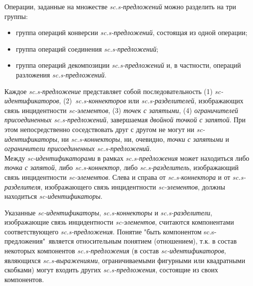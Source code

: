 Операции, заданные на множестве \textit{sc.s-предложений} можно разделить на три группы:
\begin{itemize}
	\item группа операций конверсии \textit{sc.s-предложений}, состоящая из одной операции;
	\item группа операций соединения \textit{sc.s-предложений};
	\item группа операций декомпозиции \textit{sc.s-предложений} и, в частности, операций разложения \textit{sc.s-предложений}.
\end{itemize}

\begin{SCn}
\end{SCn}

Каждое \textit{sc.s-предложение} представляет собой последовательность (1) \textit{sc-идентификаторов}, \mbox{(2) \textit{sc.s-коннекторов}} или \textit{sc.s-разделителей}, изображающих связь инцидентности \textit{sc-элементов}, (3) \textit{точек с запятыми}, (4) \textit{ограничителей присоединенных sc.s-предложений}, завершаемая \textit{двойной точкой с запятой}. При этом непосредственно соседствовать друг с другом не могут ни \textit{\mbox{sc-идентификаторы}}, ни \textit{\mbox{sc.s-коннекторы}}, ни, очевидно, \textit{точки с запятыми} и \textit{ограничители присоединенных sc.s-предложений}.\\
Между \textit{sc-идентификаторами} в рамках \textit{sc.s-предложения} может находиться либо \textit{точка с запятой}, либо \textit{sc.s-коннектор}, либо \textit{sc.s-разделитель}, изображающий связь инцидентности \textit{sc-элементов}. Слева и справа от \textit{sc.s-коннектора} и от \textit{sc.s-разделителя}, изображающего связь инцидентности \textit{sc-элементов}, должны находиться \textit{sc-идентификаторы}.

Указанные \textit{sc-идентификаторы}, \textit{sc.s-коннекторы} и \textit{sc.s-разделители}, изображающие связь инцидентности \textit{sc-элементов}, считаются компонентами соответствующего \textit{sc.s-предложения}. Понятие "быть компонентом sc.s-предложения"\ является относительным понятием (отношением), т.к. в состав некоторых компонентов \textit{sc.s-предложения} (в состав \textit{sc-идентификаторов}, являющихся \textit{sc.s-выражениями}, ограничиваемыми фигурными или квадратными скобками) могут входить других \textit{sc.s-предложения}, состоящие из своих компонентов.

